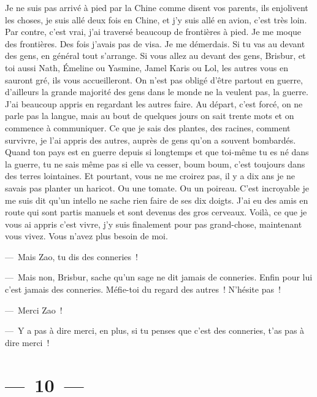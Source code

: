 \documentclass[french,twoside]{book} %
\begin{document}
\noindent Je ne suis pas arrivé à pied par la Chine comme disent vos parents, ils enjolivent les choses, je suis allé deux fois en Chine, et j’y suis allé en avion, c’est très loin. Par contre, c’est vrai, j’ai traversé beaucoup de frontières à pied. Je me moque des frontières. Des fois j’avais pas de visa. Je me démerdais. Si tu vas au devant des gens, en général tout s’arrange. Si vous allez au devant des gens, Brisbur, et toi aussi Nath, Émeline ou Yasmine, Jamel Karis ou Lol, les autres vous en sauront gré, ils vous accueilleront. On n’est pas obligé d’être partout en guerre, d’ailleurs la grande majorité des gens dans le monde ne la veulent pas, la guerre. J’ai beaucoup appris en regardant les autres faire. Au départ, c’est forcé, on ne parle pas la langue, mais au bout de quelques jours on sait trente mots et on commence à communiquer. Ce que je sais des plantes, des racines, comment survivre, je l’ai appris des autres, auprès de gens qu’on a souvent bombardés. Quand ton pays est en guerre depuis si longtemps et que toi-même tu es né dans la guerre, tu ne sais même pas si elle va cesser, boum boum, c’est toujours dans des terres lointaines. Et pourtant, vous ne me croirez pas, il y a dix ans je ne savais pas planter un haricot. Ou une tomate. Ou un poireau. C’est incroyable je me suis dit qu’un intello ne sache rien faire de ses dix doigts. J’ai eu des amis en route qui sont partis manuels et sont devenus des gros cerveaux. Voilà, ce que je vous ai appris c’est vivre, j’y suis finalement pour pas grand-chose, maintenant vous vivez. Vous n’avez plus besoin de moi.\par
— Mais Zao, tu dis des conneries !\par
— Mais non, Brisbur, sache qu’un sage ne dit jamais de conneries. Enfin pour lui c’est jamais des conneries. Méfie-toi du regard des autres ! N’hésite pas !\par
— Merci Zao !\par
— Y a pas à dire merci, en plus, si tu penses que c’est des conneries, t’as pas à dire merci !

\section[{— 10 —}]{— 10 —}
\renewcommand{\leftmark}{— 10 —}
\end{document}
